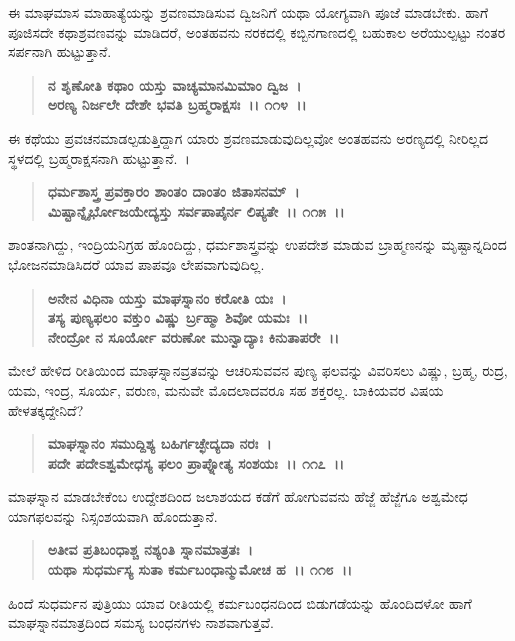 ಈ ಮಾಘಮಾಸ ಮಾಹಾತ್ಯೆಯನ್ನು ಶ್ರವಣಮಾಡಿಸುವ ದ್ವಿಜನಿಗೆ ಯಥಾ ಯೋಗ್ಯವಾಗಿ ಪೂಜೆ ಮಾಡಬೇಕು. ಹಾಗೆ ಪೂಜಿಸದೇ ಕಥಾಶ್ರವಣವನ್ನು ಮಾಡಿದರೆ, ಅಂತಹವನು ನರಕದಲ್ಲಿ ಕಬ್ಬಿನಗಾಣದಲ್ಲಿ ಬಹುಕಾಲ ಅರೆಯುಲ್ಪಟ್ಟು ನಂತರ ಸರ್ಪನಾಗಿ ಹುಟ್ಟುತ್ತಾನೆ.

\begin{verse}
\textbf{ನ ಶೃಣೋತಿ ಕಥಾಂ ಯಸ್ತು ವಾಚ್ಯಮಾನಮಿಮಾಂ ದ್ವಿಜ~।}\\\textbf{ಅರಣ್ಯ ನಿರ್ಜಲೇ ದೇಶೇ ಭವತಿ ಬ್ರಹ್ಮರಾಕ್ಷಸಃ~।। ೧೧೪~।।}
\end{verse}

ಈ ಕಥೆಯು ಪ್ರವಚನಮಾಡಲ್ಪಡುತ್ತಿದ್ದಾಗ ಯಾರು ಶ್ರವಣಮಾಡುವುದಿಲ್ಲವೋ ಅಂತಹವನು ಅರಣ್ಯದಲ್ಲಿ ನೀರಿಲ್ಲದ ಸ್ಥಳದಲ್ಲಿ ಬ್ರಹ್ಮರಾಕ್ಷಸನಾಗಿ ಹುಟ್ಟುತ್ತಾನೆ.~।

\begin{verse}
\textbf{ಧರ್ಮಶಾಸ್ತ್ರ ಪ್ರವಕ್ತಾರಂ ಶಾಂತಂ ದಾಂತಂ ಜಿತಾಸನಮ್~।}\\\textbf{ಮಿಷ್ಟಾನ್ನೈರ್ಭೋಜಯೇದ್ಯಸ್ತು ಸರ್ವಪಾಪೈರ್ನ ಲಿಪ್ಯತೇ~।। ೧೧೫~।।}
\end{verse}

ಶಾಂತನಾಗಿದ್ದು, ಇಂದ್ರಿಯನಿಗ್ರಹ ಹೊಂದಿದ್ದು, ಧರ್ಮಶಾಸ್ತ್ರವನ್ನು ಉಪದೇಶ ಮಾಡುವ ಬ್ರಾಹ್ಮಣನನ್ನು ಮೃಷ್ಟಾನ್ನದಿಂದ ಭೋಜನಮಾಡಿಸಿದರೆ ಯಾವ ಪಾಪವೂ ಲೇಪವಾಗುವುದಿಲ್ಲ.

\begin{verse}
\textbf{ಅನೇನ ವಿಧಿನಾ ಯಸ್ತು ಮಾಘಸ್ನಾನಂ ಕರೋತಿ ಯಃ~।}\\\textbf{ತಸ್ಯ ಪುಣ್ಯಫಲಂ ವಕ್ತುಂ ವಿಷ್ಣು ರ್ಬ್ರಹ್ಮಾ ಶಿವೋ ಯಮಃ~।। }\\\textbf{ನೇಂದ್ರೋ ನ ಸೂರ್ಯೋ ವರುಣೋ ಮುನ್ವಾದ್ಯಾಃ ಕಿನುತಾಪರೇ~।।}
\end{verse}

ಮೇಲೆ ಹೇಳಿದ ರೀತಿಯಿಂದ ಮಾಘಸ್ನಾನವ್ರತವನ್ನು ಆಚರಿಸುವವನ ಪುಣ್ಯ ಫಲವನ್ನು ವಿವರಿಸಲು ವಿಷ್ಣು, ಬ್ರಹ್ಮ, ರುದ್ರ, ಯಮ, ಇಂದ್ರ, ಸೂರ್ಯ, ವರುಣ, ಮನುವೇ ಮೊದಲಾದವರೂ ಸಹ ಶಕ್ತರಲ್ಲ. ಬಾಕಿಯವರ ವಿಷಯ ಹೇಳತಕ್ಕದ್ದೇನಿದೆ?

\begin{verse}
\textbf{ಮಾಘಸ್ನಾನಂ ಸಮುದ್ದಿಶ್ಯ ಬಹಿರ್ಗಚ್ಛೇದ್ಯದಾ ನರಃ~।}\\\textbf{ಪದೇ ಪದೇಽಶ್ವಮೇಧಸ್ಯ ಫಲಂ ಪ್ರಾಪ್ನೋತ್ಯ ಸಂಶಯಃ~।। ೧೧೭~।।}
\end{verse}

ಮಾಘಸ್ನಾನ ಮಾಡಬೇಕೆಂಬ ಉದ್ದೇಶದಿಂದ ಜಲಾಶಯದ ಕಡೆಗೆ ಹೋಗುವವನು ಹೆಜ್ಜೆ ಹೆಜ್ಜೆಗೂ ಅಶ್ವಮೇಧ ಯಾಗಫಲವನ್ನು ನಿಸ್ಸಂಶಯವಾಗಿ ಹೊಂದುತ್ತಾನೆ.

\begin{verse}
\textbf{ಅತೀವ ಪ್ರತಿಬಂಧಾಶ್ಚ ನಶ್ಯಂತಿ ಸ್ನಾನಮಾತ್ರತಃ~।}\\\textbf{ಯಥಾ ಸುಧರ್ಮಸ್ಯ ಸುತಾ ಕರ್ಮಬಂಧಾನ್ಮುಮೋಚ ಹ~।। ೧೧೮~।।}
\end{verse}

ಹಿಂದೆ ಸುಧರ್ಮನ ಪುತ್ರಿಯು ಯಾವ ರೀತಿಯಲ್ಲಿ ಕರ್ಮಬಂಧನದಿಂದ ಬಿಡುಗಡೆಯನ್ನು ಹೊಂದಿದಳೋ ಹಾಗೆ ಮಾಘಸ್ನಾನಮಾತ್ರದಿಂದ ಸಮಸ್ಯ ಬಂಧನಗಳು ನಾಶವಾಗುತ್ತವೆ.


